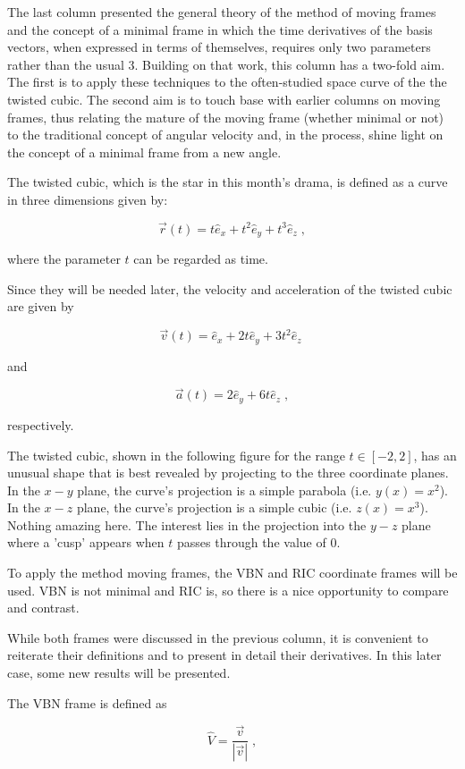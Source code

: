 \documentclass[10pt]{article}
\begin{document}
The last column presented the general theory of the method of moving frames and the concept of a minimal frame in which the time derivatives of the basis vectors, when expressed in terms of themselves, requires only two parameters rather than the usual 3.  Building on that work, this column has a two-fold aim.  The first is to apply these techniques to the often-studied space curve of the the twisted cubic.  The second aim is to touch base with earlier columns on moving frames, thus relating the mature of the moving frame (whether minimal or not) to the traditional concept of angular velocity and, in the process, shine light on the concept of a minimal frame from a new angle.

The twisted cubic, which is the star in this month's drama, is defined as a curve in three dimensions given by:

\[ \vec r(t) = t \hat e_x + t^2 \hat e_y + t^3 \hat e_z \; , \]

where the parameter $t$ can be regarded as time.

Since they will be needed later, the velocity and acceleration of the twisted cubic are given by

\[ \vec v(t) = \hat e_x + 2 t \hat e_y + 3 t^2 \hat e_z \; \]

and

\[ \vec a(t) =  2 \hat e_y + 6 t \hat e_z \; , \]

respectively.

The twisted cubic, shown in the following figure for the range $t \in [-2,2]$, has an unusual shape that is best revealed by projecting to the three coordinate planes.  In the $x-y$ plane, the curve's projection is a simple parabola (i.e. $y(x) = x^2$).  In the $x-z$ plane, the curve's projection is a simple cubic (i.e. $z(x) = x^3$).  Nothing amazing here.  The interest lies in the projection into the $y-z$ plane where a 'cusp' appears when $t$ passes through the value of 0.

To apply the method moving frames, the VBN and RIC coordinate frames will be used.  VBN is not minimal and RIC is, so there is a nice opportunity to compare and contrast.

While both frames were discussed in the previous column, it is convenient to reiterate their definitions and to present in detail their derivatives.  In this later case, some new results will be presented.

The VBN frame is defined as

\[ \hat V = \frac{\vec v}{|\vec v|} \; ,\]
\end{document}
